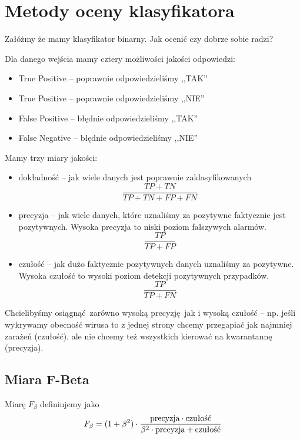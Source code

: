 \section{Metody oceny klasyfikatora}

Załóżmy że mamy klasyfikator binarny. Jak ocenić czy dobrze sobie radzi? 

Dla danego wejścia mamy cztery możliwości jakości odpowiedzi:
\begin{itemize}
    \item True Positive -- poprawnie odpowiedzieliśmy ,,TAK''
    \item True Positive -- poprawnie odpowiedzieliśmy ,,NIE''
    \item False Positive -- błędnie odpowiedzieliśmy ,,TAK''
    \item False Negative -- błędnie odpowiedzieliśmy ,,NIE''
\end{itemize}

Mamy trzy miary jakości:
\begin{itemize}
    \item dokładność -- jak wiele danych jest poprawnie zaklasyfikowanych
    \[
        \frac{TP + TN}{TP + TN + FP + FN}
    \]
    \item precyzja -- jak wiele danych, które uznaliśmy za pozytywne faktycznie jest pozytywnych. Wysoka precyzja to niski poziom fałszywych alarmów.
    \[
        \frac{TP}{TP + FP}
    \]
    \item czułość -- jak dużo faktycznie pozytywnych danych uznaliśmy za pozytywne. Wysoka czułość to wysoki poziom detekcji pozytywnych przypadków.
    \[
        \frac{TP}{TP + FN}
    \]
\end{itemize}

Chcielibyśmy osiągnąć zarówno wysoką precyzję jak i wysoką czułość -- np. jeśli wykrywamy obecność wirusa to z jednej strony chcemy przegapiać jak najmniej zarażeń (czułość), ale nie chcemy też wszystkich kierować na kwarantannę (precyzja).

\subsection{Miara F-Beta}

\begin{definition}
Miarę \( F_\beta \) definiujemy jako
\[
    F_\beta = (1 + \beta^2) \cdot \frac{\textnormal{precyzja} \cdot \textnormal{czułość}}{\beta^2 \cdot \textnormal{precyzja} + \textnormal{czułość}}
\]
\end{definition}

